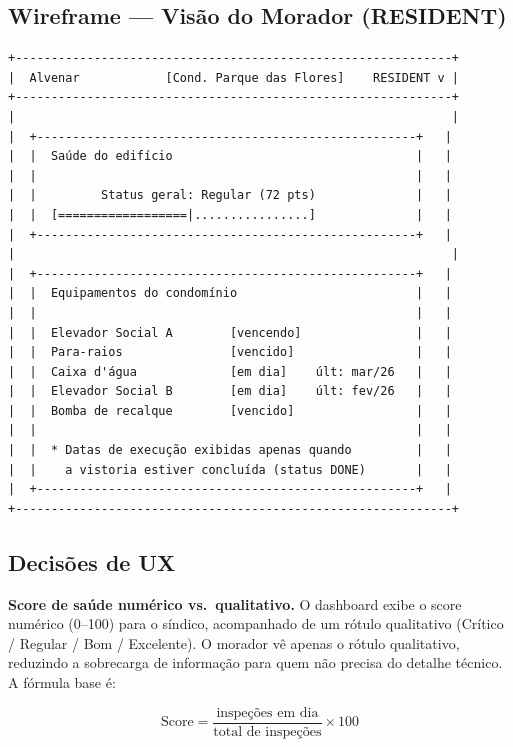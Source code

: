 \documentclass[12pt, a4paper]{article}
\begin{document}
\subsection{Wireframe — Visão do Morador (RESIDENT)}

\begin{verbatim}
+-------------------------------------------------------------+
|  Alvenar            [Cond. Parque das Flores]    RESIDENT v |
+-------------------------------------------------------------+
|                                                             |
|  +-----------------------------------------------------+   |
|  |  Saúde do edifício                                  |   |
|  |                                                     |   |
|  |         Status geral: Regular (72 pts)              |   |
|  |  [==================|................]              |   |
|  +-----------------------------------------------------+   |
|                                                             |
|  +-----------------------------------------------------+   |
|  |  Equipamentos do condomínio                         |   |
|  |                                                     |   |
|  |  Elevador Social A        [vencendo]                |   |
|  |  Para-raios               [vencido]                 |   |
|  |  Caixa d'água             [em dia]    últ: mar/26   |   |
|  |  Elevador Social B        [em dia]    últ: fev/26   |   |
|  |  Bomba de recalque        [vencido]                 |   |
|  |                                                     |   |
|  |  * Datas de execução exibidas apenas quando         |   |
|  |    a vistoria estiver concluída (status DONE)       |   |
|  +-----------------------------------------------------+   |
+-------------------------------------------------------------+
\end{verbatim}

\subsection{Decisões de UX}

\textbf{Score de saúde numérico vs.\ qualitativo.}
O dashboard exibe o score numérico (0--100) para o síndico, acompanhado de um
rótulo qualitativo (Crítico / Regular / Bom / Excelente). O morador vê apenas
o rótulo qualitativo, reduzindo a sobrecarga de informação para quem não precisa
do detalhe técnico. A fórmula base é:

\[
\text{Score} = \frac{\text{inspeções em dia}}{\text{total de inspeções}} \times 100
\]
\end{document}
